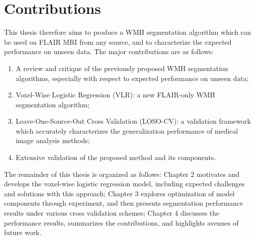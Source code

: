 \section{Contributions}
This thesis therefore aims to produce a WMH segmentation algorithm which can be used on FLAIR MRI from any source, and to characterize the expected performance on unseen data.
The major contributions are as follows:
\begin{enumerate}
  \item A review and critique of the previously proposed WMH segmentation algorithms, especially with respect to expected performance on unseen data;
  \item Voxel-Wise Logistic Regression (VLR): a new FLAIR-only WMH segmentation algorithm;
  \item Leave-One-Source-Out Cross Validation (LOSO-CV): a validation framework which accurately characterizes the generalization performance of medical image analysis methods;
  \item Extensive validation of the proposed method and its components.
\end{enumerate}
The remainder of this thesis is organized as follows:
Chapter 2 motivates and develops the voxel-wise logistic regression model, including expected challenges and solutions with this approach;
Chapter 3 explores optimization of model components through experiment, and then presents segmentation performance results under various cross validation schemes;
Chapter 4 discusses the performance results, summarizes the contributions, and highlights avenues of future work.
